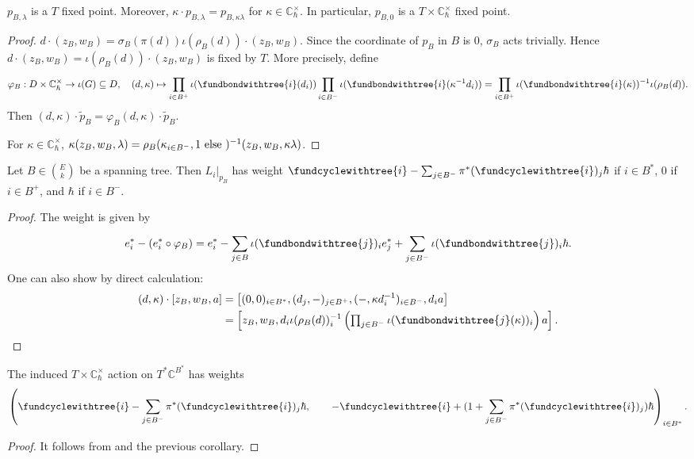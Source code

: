 \documentclass[b5paper]{article}
\newcommand{\Chbar}{\mathbb{C}^\times _\hbar}
\begin{document}
\begin{proposition}[pps:]{}
  $p_{B,\lambda}$ is a $T$ fixed point.
  Moreover, $\kappa\cdot p_{B,\lambda}=p_{B,\kappa\lambda}$ for $\kappa\in \Chbar$. In particular, $p_{B,0}$ is a $T\times \Chbar$ fixed point.
  \begin{proof}
    $d\cdot (z_B,w_B)=\sigma_B(\pi(d))\iota(\rho_B(d))\cdot (z_B,w_B)$. Since the coordinate of $p_B$ in $B$ is $0$, $\sigma_B$ acts trivially. Hence $d\cdot (z_B,w_B)=\iota(\rho_B(d))\cdot (z_B,w_B)$ is fixed by $T$.
    More precisely, define
    \[
        \varphi_B:D\times \Chbar\rightarrow \iota(G)\subseteq D,\quad 
        (d,\kappa)\mapsto \prod_{i\in B^+}^{}\iota(\fundbondwithtree{i}(d_i))\prod_{i\in B^-}^{}\iota(\fundbondwithtree{i}(\kappa^{-1}d_i))=\prod_{i\in B^+}^{}\iota(\fundbondwithtree{i}(\kappa))^{-1}\iota(\rho_B(d)).
    \]
    Then $(d,\kappa)\cdot \tilde{p}_B=\varphi_B(d,\kappa)\cdot \tilde{p}_B$.

    For $\kappa\in \Chbar$, $\kappa(z_B,w_B,\lambda)=\rho_B(\kappa_{i\in B^-},1\textnormal{ else })^{-1}(z_B,w_B,\kappa\lambda)$.
  \end{proof}
\end{proposition}

\begin{corollary}[crl:]{}
  Let $B\in \binom{E}{k}$ be a spanning tree. Then $\left.L_i\right|_{p_B}$ has weight $\fundcyclewithtree{i}-\sum_{j\in B^-}^{}\pi^*(\fundcyclewithtree{i})_j\hbar$ if $i\in B^*$, $0$ if $i\in B^+$, and $\hbar$ if $i\in B^-$.
      \begin{proof}
          The weight is given by 
          \[
              e_i^*-(e_i^*\circ \varphi_B)=e_i^*-\sum_{j\in B}^{}\iota(\fundbondwithtree{j})_ie_j^*+\sum_{j\in B^-}^{}\iota(\fundbondwithtree{j})_i\hbar.
          \]
          One can also show by direct calculation:
          \begin{alignat*}{1}
              (d,\kappa)\cdot [z_B,w_B,a]
              &=\left[(0,0)_{i\in B^*}, (d_j,-)_{j\in B^+}, (-,\kappa d_i^{-1})_{i\in B^-}, d_ia\right]\\
              &= \textstyle\left[z_B,w_B,d_i\iota(\rho_B(d))^{-1}_i\left(\prod_{j\in B^-}^{}\iota(\fundbondwithtree{j}(\kappa))_i\right)a\right].
          \end{alignat*}
      \end{proof}
\end{corollary}

\begin{corollary}{}
  The induced $T\times \Chbar$ action on $T^*\mathbb{C}^{B^*}$ has weights 
  \[
    \left(
      \fundcyclewithtree{i}-\sum_{j\in B^-}^{}\pi^*(\fundcyclewithtree{i})_j\hbar,\qquad 
    -\fundcyclewithtree{i}+(1+\sum_{j\in B^-}^{}\pi^*(\fundcyclewithtree{i})_j)\hbar
  \right)_{i\in B^*}.
  \]
  \begin{proof}
      It follows from  and the previous corollary.
  \end{proof}
\end{corollary}
\end{document}

